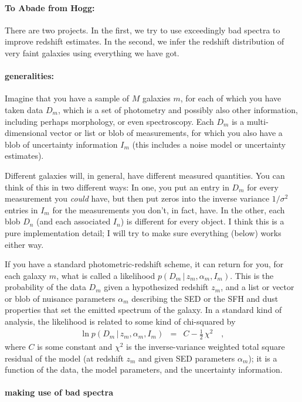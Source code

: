 \documentclass[12pt]{article}
\newcommand{\given}{\,|\,}
\begin{document}
\paragraph{To Abade from Hogg:}
There are two projects.  In the first, we try to use exceedingly bad
spectra to improve redshift estimates.  In the second, we infer the
redshift distribution of very faint galaxies using everything we have
got.

\paragraph{generalities:}
Imagine that you have a sample of $M$ galaxies $m$, for each of which
you have taken data $D_m$, which is a set of photometry and possibly
also other information, including perhaps morphology, or even
spectroscopy.  Each $D_m$ is a multi-dimensional vector or list or
blob of measurements, for which you also have a blob of uncertainty
information $I_m$ (this includes a noise model or uncertainty
estimates).

Different galaxies will, in general, have different measured
quantities.  You can think of this in two different ways: In one, you
put an entry in $D_m$ for every measurement you \emph{could} have, but
then put zeros into the inverse variance $1/\sigma^2$ entries in $I_m$
for the measurements you don't, in fact, have.  In the other, each
blob $D_n$ (and each associated $I_n$) is different for every object.
I think this is a pure implementation detail; I will try to make sure
everything (below) works either way.

If you have a standard photometric-redshift scheme, it can return for
you, for each galaxy $m$, what is called a likelihood $p(D_m \given
z_m,\alpha_m,I_m)$.  This is the probability of the data $D_m$ given a
hypothesized redshift $z_m$, and a list or vector or blob of nuisance
parameters $\alpha_m$ describing the SED or the SFH and dust
properties that set the emitted spectrum of the galaxy.  In a standard
kind of analysis, the likelihood is related to some kind of
chi-squared by
\begin{eqnarray}
\ln p(D_m \given z_m, \alpha_m, I_m) &=& C-\frac{1}{2}\,\chi^2
\quad,
\end{eqnarray}
where $C$ is some constant and $\chi^2$ is the inverse-variance
weighted total square residual of the model (at redshift $z_m$ and
given SED parameters $\alpha_m$); it is a function of the data, the
model parameters, and the uncertainty information.

\paragraph{making use of bad spectra}
\end{document}
